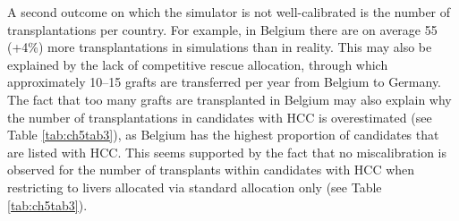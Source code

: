 \documentclass[11pt,twoside,]{book}
\begin{document}
A second outcome on which the simulator is not well-calibrated is the
number of transplantations per country. For example, in Belgium there
are on average 55 (+4\%) more transplantations in simulations than in
reality. This may also be explained by the lack of competitive rescue
allocation, through which approximately 10--15
grafts are transferred per year from Belgium to Germany. The fact that
too many grafts are transplanted in Belgium may also explain why the
number of transplantations in candidates with HCC is overestimated
(see Table \ref{tab:ch5tab3}), as Belgium has the highest proportion of
candidates that are listed with HCC. This seems supported by the fact that no
miscalibration is observed for the number of transplants within candidates with
HCC when restricting to livers allocated via standard allocation only
(see Table \ref{tab:ch5tab3}).

\begin{table}[h]
\caption{Priority of candidates in cases where a liver was initially accepted but later declined, and then re-allocated to a different recipient through competitive rescue liver allocation between January 1, 2016, and December 31, 2019. The table shows the number of candidates in each priority score category. For MELD scores, separate counts are included for the match-MELD score and lab-MELD score.}
\label{tab:tabcomprescue}
\centering
{}
\end{table}
\end{document}
